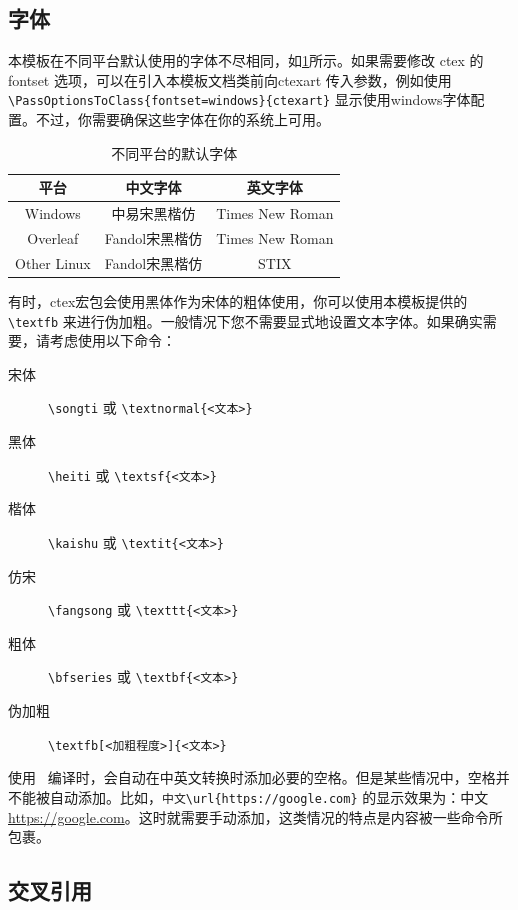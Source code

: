 \documentclass{nktba}
\begin{document}
\subsection{字体}

本模板在不同平台默认使用的字体不尽相同，如\ref{tab:ctex-fontset}所示。如果需要修改 ctex 的 fontset 选项，可以在引入本模板文档类前向ctexart 传入参数，例如使用 \verb| \PassOptionsToClass{fontset=windows}{ctexart}| 显示使用windows字体配置。不过，你需要确保这些字体在你的系统上可用。

\begin{table}
  \centering
  \caption{不同平台的默认字体}
  \begin{tabular}{ccc}
  \toprule
  平台 & 中文字体 & 英文字体 \\
  \midrule
  Windows & 中易宋黑楷仿 & Times New Roman \\
  Overleaf & Fandol宋黑楷仿 & Times New Roman\\
  Other Linux & Fandol宋黑楷仿 & STIX \\
  \bottomrule
  \end{tabular}
  \label{tab:ctex-fontset}
\end{table}

有时，ctex宏包会使用黑体作为宋体的粗体使用，你可以使用本模板提供的\verb|\textfb| 来进行伪加粗。一般情况下您不需要显式地设置文本字体。如果确实需要，请考虑使用以下命令：

\begin{description}
\item[宋体] \verb|\songti| 或 \verb|\textnormal{<文本>}|
\item[黑体] \verb|\heiti| 或 \verb|\textsf{<文本>}|
\item[楷体] \verb|\kaishu|  或 \verb|\textit{<文本>}|
\item[仿宋] \verb|\fangsong| 或 \verb|\texttt{<文本>}|
\item[粗体] \verb|\bfseries| 或 \verb|\textbf{<文本>}|
\item[伪加粗] \verb|\textfb[<加粗程度>]{<文本>}|
\end{description}

使用 \ 编译时，会自动在中英文转换时添加必要的空格。但是某些情况中，空格并不能被自动添加。比如，\verb|中文\url{https://google.com}| 的显示效果为：中文\url{https://google.com}。这时就需要手动添加，这类情况的特点是内容被一些命令所包裹。

\subsection{交叉引用} \label{sec:ex:A}
\end{document}
